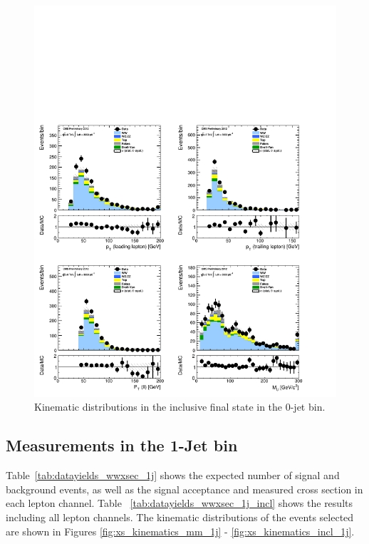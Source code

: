 \begin{figure}[!hbtp]
\centering
\includegraphics[width=1\textwidth]{figures/ww_analysis20_0_ALL_incl_0j.pdf}
\caption{Kinematic distributions in the inclusive final state in the 0-jet bin.}
\label{fig:xs_kinematics_incl_0j}
\end{figure}

\clearpage
\subsection{Measurements in the 1-Jet bin}

Table~\ref{tab:datayields_wwxsec_1j} shows the expected number of signal and background events,
as well as the signal acceptance and measured cross section in each lepton channel.
Table ~\ref{tab:datayields_wwxsec_1j_incl} shows the results including all lepton channels.
The kinematic distributions of the events selected are shown in Figures \ref{fig:xs_kinematics_mm_1j} - \ref{fig:xs_kinematics_incl_1j}.

